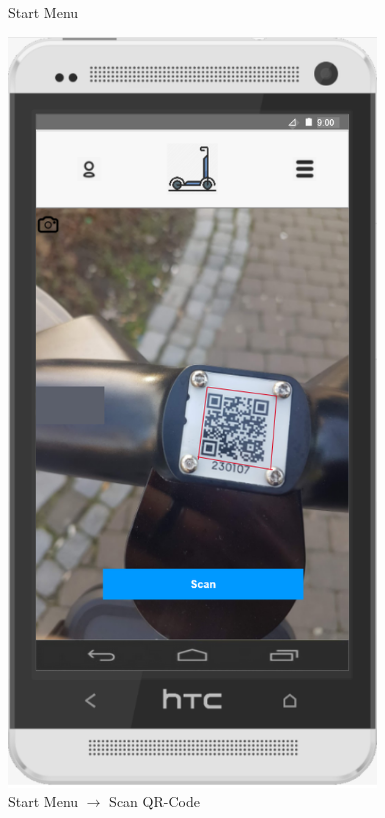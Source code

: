 \documentclass[a4paper, 12pt]{article}
\begin{document}
\begin{figure} [htbp]
\begin{center}
\begin{minipage}{0.45\textwidth}
\begin{center}
            \end{center}
            \caption{Start Menu}
        \end{minipage}\hfill
        \begin{minipage}{0.45\textwidth}
            \begin{center}
                \includegraphics[width=0.87\textwidth]{images/prototypes/01-01-start-menu--scan-qr-code.png}
            \end{center}
            \caption{Start Menu $\rightarrow$ Scan QR-Code}
        \end{minipage}
    \end{center}
\end{figure}
\end{document}

